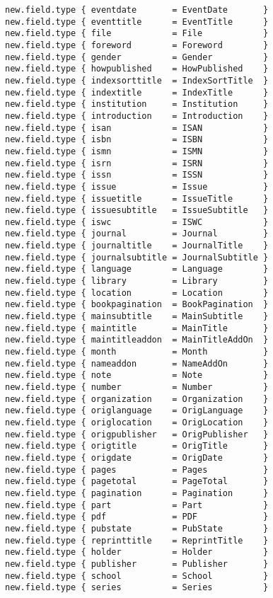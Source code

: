 \documentclass[11pt,a4paper]{scrbook}
\begin{document}
\begin{lstlisting}[language=BibTool]
new.field.type { eventdate       = EventDate       }
new.field.type { eventtitle      = EventTitle      }
new.field.type { file            = File            }
new.field.type { foreword        = Foreword        }
new.field.type { gender          = Gender          }
new.field.type { howpublished    = HowPublished    }
new.field.type { indexsorttitle  = IndexSortTitle  }
new.field.type { indextitle      = IndexTitle      }
new.field.type { institution     = Institution     }
new.field.type { introduction    = Introduction    }
new.field.type { isan            = ISAN            }
new.field.type { isbn            = ISBN            }
new.field.type { ismn            = ISMN            }
new.field.type { isrn            = ISRN            }
new.field.type { issn            = ISSN            }
new.field.type { issue           = Issue           }
new.field.type { issuetitle      = IssueTitle      }
new.field.type { issuesubtitle   = IssueSubtitle   }
new.field.type { iswc            = ISWC            }
new.field.type { journal         = Journal         }
new.field.type { journaltitle    = JournalTitle    }
new.field.type { journalsubtitle = JournalSubtitle }
new.field.type { language        = Language        }
new.field.type { library         = Library         }
new.field.type { location        = Location        }
new.field.type { bookpagination  = BookPagination  }
new.field.type { mainsubtitle    = MainSubtitle    }
new.field.type { maintitle       = MainTitle       }
new.field.type { maintitleaddon  = MainTitleAddOn  }
new.field.type { month           = Month           }
new.field.type { nameaddon       = NameAddOn       }
new.field.type { note            = Note            }
new.field.type { number          = Number          }
new.field.type { organization    = Organization    }
new.field.type { origlanguage    = OrigLanguage    }
new.field.type { origlocation    = OrigLocation    }
new.field.type { origpublisher   = OrigPublisher   }
new.field.type { origtitle       = OrigTitle       }
new.field.type { origdate        = OrigDate        }
new.field.type { pages           = Pages           }
new.field.type { pagetotal       = PageTotal       }
new.field.type { pagination      = Pagination      }
new.field.type { part            = Part            }
new.field.type { pdf             = PDF             }
new.field.type { pubstate        = PubState        }
new.field.type { reprinttitle    = ReprintTitle    }
new.field.type { holder          = Holder          }
new.field.type { publisher       = Publisher       }
new.field.type { school          = School          }
new.field.type { series          = Series          }

\end{lstlisting}
\end{document}
